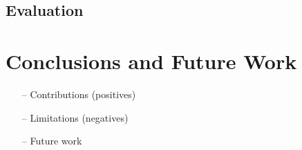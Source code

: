 \documentclass[english,12pt,a4paper,pdftex,sci,utf8]{aaltothesis}
\begin{document}





\subsection{Evaluation}
\label{sec:evaluation}







\clearpage
\section{Conclusions and Future Work} 
\label{sec:conclusions}

\begin{itemize}
\item[--]Contributions (positives)
\item[--]Limitations (negatives)
\item[--]Future work
\end{itemize}
\end{document}

